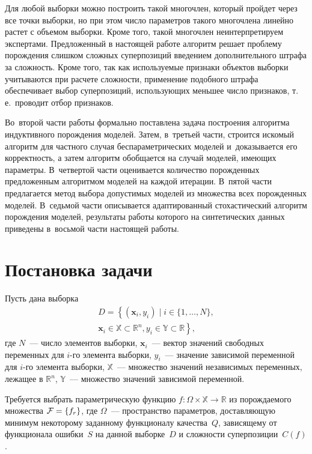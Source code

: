 \begin{multicols}{2}
Для любой выборки можно построить такой многочлен, который пройдет через
все точки выборки, но при этом число параметров такого многочлена линейно
растет с объемом выборки. Кроме того, такой многочлен неинтерпретируем
экспертами. Предложенный в настоящей работе алгоритм решает проблему
порождения слишком сложных суперпозиций введением дополнительного штрафа
за сложность. Кроме того, так как ис\-поль\-зу\-емые признаки объектов выборки
учитываются при расчете сложности, применение подобного штрафа обеспечивает
выбор суперпозиций, использующих меньшее число признаков, т.\,е.\ проводит
отбор признаков.

Во~второй части работы формально поставлена задача построения алгоритма
индуктивного по\-рож\-де\-ния моделей. Затем, в~третьей час\-ти, строится искомый
алгоритм для частного случая беспараметрических моделей и~доказывается его
корректность, а затем алгоритм обобщается на случай моделей, имеющих параметры.
В~четвертой час\-ти оценивается количество порожденных предложенным алгоритмом
моделей на каждой итерации. В~пятой час\-ти предлагается метод выбора
допустимых моделей из множества всех порожденных моделей. В~седьмой час\-ти
описывается адаптированный стохастический алгоритм порождения моделей,
результаты работы которого на синтетических данных приведены в~восьмой
части настоящей работы.

\section{Постановка задачи}

Пусть дана выборка
\begin{multline*}
D = \left\{ (\mathbf{x}_i, y_i) \mid i \in \{1, \dots, N\},\right.\\
           \left. \mathbf{x}_i \in \mathbb{X} \subset \mathbb{R}^n,
            y_i \in \mathbb{Y} \subset \mathbb{R} \right\},
\end{multline*}
где $N$~--- число элементов выборки, $\mathbf{x}_i$~--- вектор значений
свободных переменных для $i$-го элемента выборки, $y_i$~--- значение зависимой
переменной для $i$-го элемента выборки,
$\mathbb{X}$~--- множество значений независимых переменных, лежащее в
$\mathbb{R}^n$, $\mathbb{Y}$~--- множество значений зависимой переменной.

Требуется выбрать параметрическую функцию
$f : \Omega \times \mathbb{X} \rightarrow \mathbb{R}$ из
порождаемого множества $\mathcal{F} \hm= \{ f_r \}$, где $\Omega$~--- пространство
параметров, до\-став\-ля\-ющую минимум некоторому заданному функционалу качества~$Q$,
зависящему от функционала ошибки~$S$ на данной выборке~$D$ и сложности суперпозиции~$C(f)$.


\end{multicols}
